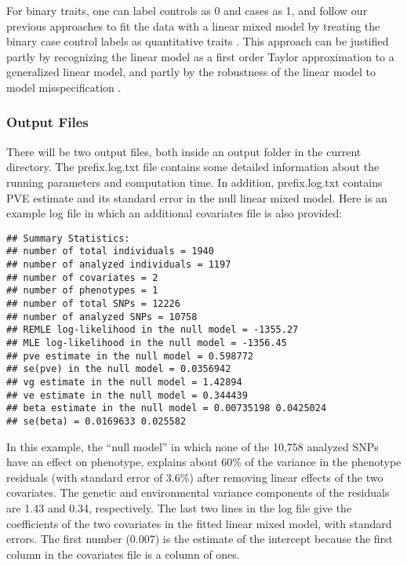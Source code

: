\documentclass[11pt]{article}
\begin{document}
For binary traits, one can label controls as 0 and cases as 1, and
follow our previous approaches to fit the data with a linear mixed
model by treating the binary case control labels as quantitative
traits \cite{Zhou:2012, Zhou:2013}. This approach can be justified
partly by recognizing the linear model as a first order Taylor
approximation to a generalized linear model, and partly by the
robustness of the linear model to model misspecification
\cite{Zhou:2013}.

\subsubsection{Output Files}

There will be two output files, both inside an output folder in the
current directory. The prefix.log.txt file contains some detailed
information about the running parameters and computation time. In
addition, prefix.log.txt contains PVE estimate and its standard error
in the null linear mixed model. Here is an example log file in which
an additional covariates file is also provided:
%
\begin{verbatim}
## Summary Statistics:
## number of total individuals = 1940
## number of analyzed individuals = 1197
## number of covariates = 2
## number of phenotypes = 1
## number of total SNPs = 12226
## number of analyzed SNPs = 10758
## REMLE log-likelihood in the null model = -1355.27
## MLE log-likelihood in the null model = -1356.45
## pve estimate in the null model = 0.598772
## se(pve) in the null model = 0.0356942
## vg estimate in the null model = 1.42894
## ve estimate in the null model = 0.344439
## beta estimate in the null model = 0.00735198 0.0425024
## se(beta) = 0.0169633 0.025582
\end{verbatim}
%
In this example, the ``null model'' in which none of the 10,758
analyzed SNPs have an effect on phenotype, explains about 60\% of the
variance in the phenotype residuals (with standard error of 3.6\%)
after removing linear effects of the two covariates. The genetic and
environmental variance components of the residuals are 1.43 and 0.34,
respectively. The last two lines in the log file give the coefficients
of the two covariates in the fitted linear mixed model, with standard
errors. The first number (0.007) is the estimate of the intercept
because the first column in the covariates file is a column of ones.
\end{document}
